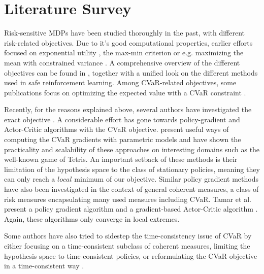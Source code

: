


\section{Literature Survey}\label{sec:prelim:literature}

Risk-sensitive MDPs have been studied thoroughly in the past, with different risk-related objectives. Due to it's good computational properties, earlier efforts focused on exponential utility \citep{howard1972risk}, the max-min criterion \citep{coraluppi1998optimal} or e.g. maximizing the mean with constrained variance \citep{sobel1982variance}. A comprehensive overview of the different objectives can be found in \citet{garcia2015comprehensive}, together with a unified look on the different methods used in safe reinforcement learning. Among CVaR-related objectives, some publications focus on optimizing the expected value with a CVaR constraint \citep{borkar2010risk, prashanth2014policy}.

Recently, for the reasons explained above, several authors have investigated the exact objective . A considerable effort has gone towards policy-gradient \citep{sutton2000policy} and Actor-Critic \citep{konda2000actor} algorithms with the CVaR objective. \citet{tamar2015optimizing, chow2014algorithms} present useful ways of computing the CVaR gradients with parametric models and have shown the practicality and scalability of these approaches on interesting domains such as the well-known game of Tetris. An important setback of these methods is their limitation of the hypothesis space to the class of stationary policies, meaning they can only reach a $local$ minimum of our objective.
Similar policy gradient methods have also been investigated in the context of general coherent measures, a class of risk measures encapsulating many used measures including CVaR. Tamar et al. present a policy gradient algorithm and a gradient-based Actor-Critic algorithm \citep{tamar2017sequential}. Again, these algorithms only converge in local extremes.

Some authors have also tried to sidestep the time-consistency issue of CVaR by either focusing on a time-consistent subclass of coherent measures, limiting the hypothesis space to time-consistent policies, or reformulating the CVaR objective in a time-consistent way \cite{miller2017optimal}.


